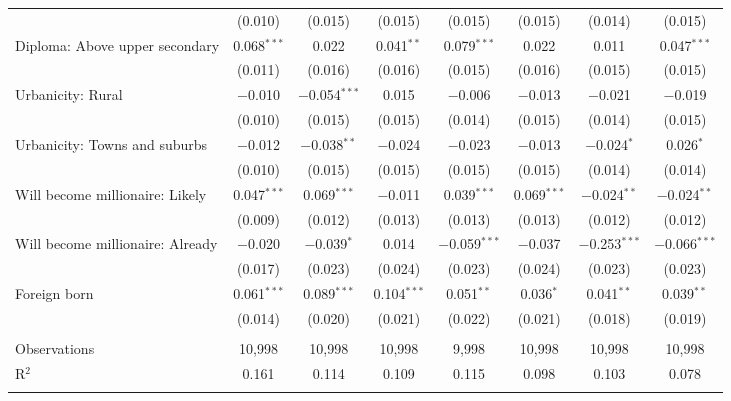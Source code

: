 \begin{tabular}{@{\extracolsep{5pt}}lccccccc}
  & (0.010) & (0.015) & (0.015) & (0.015) & (0.015) & (0.014) & (0.015) \\ 
  Diploma: Above upper secondary & 0.068$^{***}$ & 0.022 & 0.041$^{**}$ & 0.079$^{***}$ & 0.022 & 0.011 & 0.047$^{***}$ \\ 
  & (0.011) & (0.016) & (0.016) & (0.015) & (0.016) & (0.015) & (0.015) \\ 
  Urbanicity: Rural & $-$0.010 & $-$0.054$^{***}$ & 0.015 & $-$0.006 & $-$0.013 & $-$0.021 & $-$0.019 \\ 
  & (0.010) & (0.015) & (0.015) & (0.014) & (0.015) & (0.014) & (0.015) \\ 
  Urbanicity: Towns and suburbs & $-$0.012 & $-$0.038$^{**}$ & $-$0.024 & $-$0.023 & $-$0.013 & $-$0.024$^{*}$ & 0.026$^{*}$ \\ 
  & (0.010) & (0.015) & (0.015) & (0.015) & (0.015) & (0.014) & (0.014) \\ 
  Will become millionaire: Likely & 0.047$^{***}$ & 0.069$^{***}$ & $-$0.011 & 0.039$^{***}$ & 0.069$^{***}$ & $-$0.024$^{**}$ & $-$0.024$^{**}$ \\ 
  & (0.009) & (0.012) & (0.013) & (0.013) & (0.013) & (0.012) & (0.012) \\ 
  Will become millionaire: Already & $-$0.020 & $-$0.039$^{*}$ & 0.014 & $-$0.059$^{***}$ & $-$0.037 & $-$0.253$^{***}$ & $-$0.066$^{***}$ \\ 
  & (0.017) & (0.023) & (0.024) & (0.023) & (0.024) & (0.023) & (0.023) \\ 
  Foreign born & 0.061$^{***}$ & 0.089$^{***}$ & 0.104$^{***}$ & 0.051$^{**}$ & 0.036$^{*}$ & 0.041$^{**}$ & 0.039$^{**}$ \\ 
  & (0.014) & (0.020) & (0.021) & (0.022) & (0.021) & (0.018) & (0.019) \\ 
 \hline \\[-1.8ex] 

Observations & 10,998 & 10,998 & 10,998 & 9,998 & 10,998 & 10,998 & 10,998 \\ 
R$^{2}$ & 0.161 & 0.114 & 0.109 & 0.115 & 0.098 & 0.103 & 0.078 \\ 
\hline 
\hline \\[-1.8ex] 
\end{tabular} 